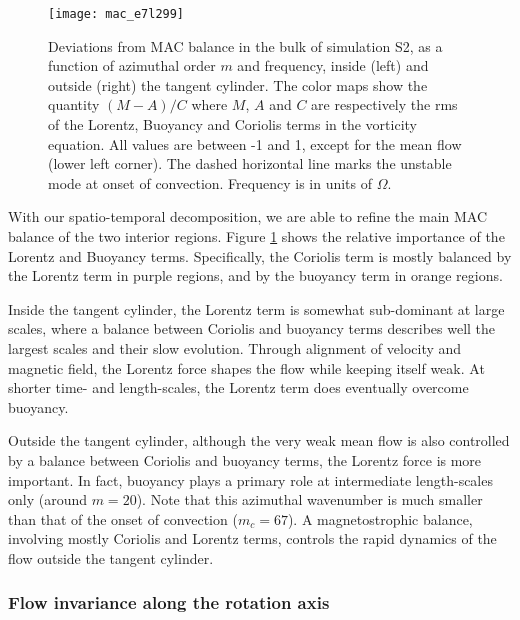 \documentclass[12pt, a4paper]{article}
\begin{document}
\begin{figure}
\begin{center}
\texttt{[image: mac\_e7l299]}
\caption{Deviations from MAC balance in the bulk of simulation %
S2, as a function of azimuthal order $m$ and frequency, inside (left) and outside (right) the tangent cylinder.
The color maps show the quantity $(M-A)/C$ where $M$, $A$ and $C$ are respectively the rms of the Lorentz, Buoyancy and Coriolis terms in the vorticity equation.
All values are between -1 and 1, except for the mean flow (lower left corner).
The dashed horizontal line marks the unstable mode at onset of convection.
Frequency is in units of $\Omega$.
}
\label{fig:mac_S2}
\end{center}
\end{figure}

With our spatio-temporal decomposition, we are able to refine the main MAC balance of the two interior regions.
Figure \ref{fig:mac_S2} shows the relative importance of the Lorentz and Buoyancy terms.
Specifically, the Coriolis term is mostly balanced by the Lorentz term in purple regions, and by the buoyancy term in orange regions.

Inside the tangent cylinder, the Lorentz term is somewhat sub-dominant at large scales, where a balance between Coriolis and buoyancy terms describes well the largest scales and their slow evolution.
Through alignment of velocity and magnetic field, the Lorentz force shapes the flow while keeping itself weak.
At shorter time- and length-scales, the Lorentz term does eventually overcome buoyancy.

Outside the tangent cylinder, although the very weak mean flow is also controlled by a balance between Coriolis and buoyancy terms, the Lorentz force is more important.
In fact, buoyancy plays a primary role at intermediate length-scales only (around $m=20$).
Note that this azimuthal wavenumber is much smaller than that of the onset of convection ($m_c=67$).
A magnetostrophic balance, involving mostly Coriolis and Lorentz terms, controls the rapid dynamics of the flow outside the tangent cylinder.

\subsubsection{Flow invariance along the rotation axis}
\end{document}
